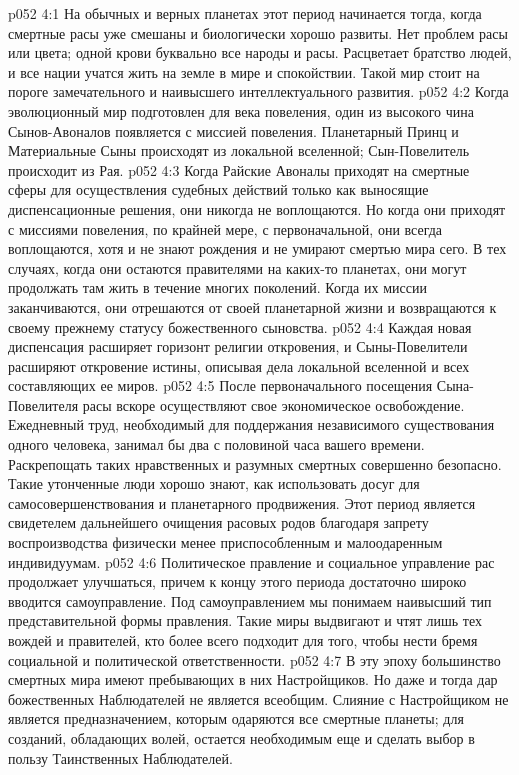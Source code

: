 \vs p052 4:1 На обычных и верных планетах этот период начинается тогда, когда смертные расы уже смешаны и биологически хорошо развиты. Нет проблем расы или цвета; одной крови буквально все народы и расы. Расцветает братство людей, и все нации учатся жить на земле в мире и спокойствии. Такой мир стоит на пороге замечательного и наивысшего интеллектуального развития.
\vs p052 4:2 \pc Когда эволюционный мир подготовлен для века повеления, один из высокого чина Сынов\hyp{}Авоналов появляется с миссией повеления. Планетарный Принц и Материальные Сыны происходят из локальной вселенной; Сын\hyp{}Повелитель происходит из Рая.
\vs p052 4:3 Когда Райские Авоналы приходят на смертные сферы для осуществления судебных действий только как выносящие диспенсационные решения, они никогда не воплощаются. Но когда они приходят с миссиями повеления, по крайней мере, с первоначальной, они всегда воплощаются, хотя и не знают рождения и не умирают смертью мира сего. В тех случаях, когда они остаются правителями на каких\hyp{}то планетах, они могут продолжать там жить в течение многих поколений. Когда их миссии заканчиваются, они отрешаются от своей планетарной жизни и возвращаются к своему прежнему статусу божественного сыновства.
\vs p052 4:4 Каждая новая диспенсация расширяет горизонт религии откровения, и Сыны\hyp{}Повелители расширяют откровение истины, описывая дела локальной вселенной и всех составляющих ее миров.
\vs p052 4:5 \pc После первоначального посещения Сына\hyp{}Повелителя расы вскоре осуществляют свое экономическое освобождение. Ежедневный труд, необходимый для поддержания независимого существования одного человека, занимал бы два с половиной часа вашего времени. Раскрепощать таких нравственных и разумных смертных совершенно безопасно. Такие утонченные люди хорошо знают, как использовать досуг для самосовершенствования и планетарного продвижения. Этот период является свидетелем дальнейшего очищения расовых родов благодаря запрету воспроизводства физически менее приспособленным и малоодаренным индивидуумам.
\vs p052 4:6 Политическое правление и социальное управление рас продолжает улучшаться, причем к концу этого периода достаточно широко вводится самоуправление. Под самоуправлением мы понимаем наивысший тип представительной формы правления. Такие миры выдвигают и чтят лишь тех вождей и правителей, кто более всего подходит для того, чтобы нести бремя социальной и политической ответственности.
\vs p052 4:7 В эту эпоху большинство смертных мира имеют пребывающих в них Настройщиков. Но даже и тогда дар божественных Наблюдателей не является всеобщим. Слияние с Настройщиком не является предназначением, которым одаряются все смертные планеты; для созданий, обладающих волей, остается необходимым еще и сделать выбор в пользу Таинственных Наблюдателей.
